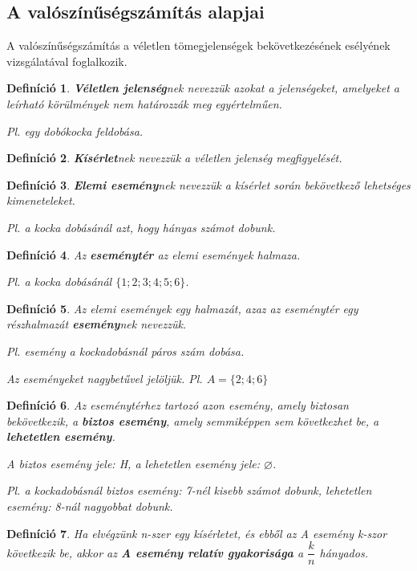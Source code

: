 \documentclass[12pt,a4paper]{article}
\newtheorem{definition}{Definíció} [section]
\begin{document}
\subsection{A valószínűségszámítás alapjai}
A valószínűségszámítás a véletlen tömegjelenségek bekövetkezésének esélyének vizsgálatával foglalkozik.
\begin{definition}
\textbf{Véletlen jelenség}nek nevezzük azokat a jelenségeket, amelyeket a leírható körülmények nem határozzák meg egyértelműen.

Pl. egy dobókocka feldobása.
\end{definition}

\begin{definition}
\textbf{Kísérlet}nek nevezzük a véletlen jelenség megfigyelését.
\end{definition}

\begin{definition}
\textbf{Elemi esemény}nek nevezzük a kísérlet során bekövetkező lehetséges kimeneteleket.

Pl. a kocka dobásánál azt, hogy hányas számot dobunk.
\end{definition}

\begin{definition}
Az \textbf{eseménytér} az elemi események halmaza.

Pl. a kocka dobásánál $\{1; 2; 3; 4; 5; 6\}$.
\end{definition}

\begin{definition}
Az elemi események egy halmazát, azaz az eseménytér egy részhalmazát \textbf{esemény}nek nevezzük.

Pl. esemény a kockadobásnál páros szám dobása.

Az eseményeket nagybetűvel jelöljük. Pl. $A = \{2; 4; 6\}$
\end{definition}

\begin{definition}
Az eseménytérhez tartozó azon esemény, amely biztosan bekövetkezik, a \textbf{biztos esemény}, amely semmiképpen sem következhet be, a \textbf{lehetetlen esemény}.

A biztos esemény jele: H, a lehetetlen esemény jele: $\varnothing$.

Pl. a kockadobásnál biztos esemény: 7-nél kisebb számot dobunk, lehetetlen esemény: 8-nál nagyobbat dobunk.
\end{definition}

\begin{definition}
Ha elvégzünk n-szer egy kísérletet, és ebből az A esemény k-szor következik be, akkor
az \textbf{A esemény relatív gyakorisága} a $\dfrac{k}{n}$ hányados.
\end{definition}
\end{document}
